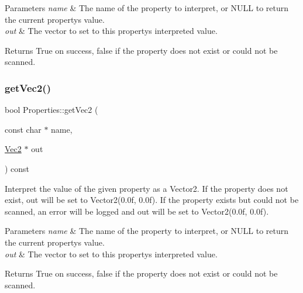\begin{DoxyParams}{Parameters}
{\em name} & The name of the property to interpret, or N\+U\+LL to return the current property\textquotesingle{}s value. \\
\hline
{\em out} & The vector to set to this property\textquotesingle{}s interpreted value.\\
\hline
\end{DoxyParams}
\begin{DoxyReturn}{Returns}
True on success, false if the property does not exist or could not be scanned. 
\end{DoxyReturn}
\mbox{\label{classProperties_ad1eacd687cc1f90c31dba67e071aac62}} 
\subsubsection{\texorpdfstring{get\+Vec2()}{getVec2()}\hspace{0.1cm}{\footnotesize\ttfamily [2/2]}}
{\footnotesize\ttfamily bool Properties\+::get\+Vec2 (\begin{DoxyParamCaption}\item[{const char $\ast$}]{name,  }\item[{\hyperlink{classVec2}{Vec2} $\ast$}]{out }\end{DoxyParamCaption}) const}

Interpret the value of the given property as a Vector2. If the property does not exist, out will be set to Vector2(0.\+0f, 0.\+0f). If the property exists but could not be scanned, an error will be logged and out will be set to Vector2(0.\+0f, 0.\+0f).


\begin{DoxyParams}{Parameters}
{\em name} & The name of the property to interpret, or N\+U\+LL to return the current property\textquotesingle{}s value. \\
\hline
{\em out} & The vector to set to this property\textquotesingle{}s interpreted value.\\
\hline
\end{DoxyParams}
\begin{DoxyReturn}{Returns}
True on success, false if the property does not exist or could not be scanned. 
\end{DoxyReturn}
\mbox{\label{classProperties_a5ea69d8939c4f73a4f271c5ebc1ff718}} 
